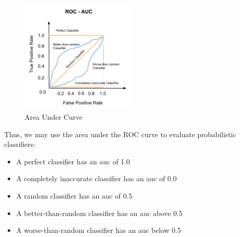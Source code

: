 \begin{figure}
    \centering
    \includegraphics[width=0.5\textwidth]{Figures/02/02_AUC.png}
    \caption{Area Under Curve}
    \label{fig:02_auc}
\end{figure}


Thus, we may use the area under the ROC curve to evaluate probabilistic classifiers:

\begin{itemize}
    \item A perfect classifier has an \gls{auc} of 1.0
    \item A completely inaccurate classifier has an \gls{auc} of 0.0
    \item A random classifier has an \gls{auc} of 0.5
    \item A better-than-random classifier has an \gls{auc} above 0.5
    \item A worse-than-random classifier has an \gls{auc} below 0.5
\end{itemize}

